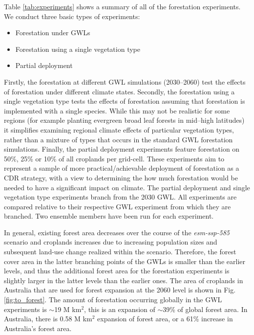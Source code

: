 \documentclass[]{article}
\begin{document}
Table \ref{tab:experiments} shows a summary of all of the forestation experiments. We conduct three basic types of experiments:

\begin{itemize}
    \item Forestation under GWLs
    \item Forestation using a single vegetation type
    \item Partial deployment
\end{itemize}

Firstly, the forestation at different GWL simulations (2030--2060) test the effects of forestation under different climate states.
Secondly, the forestation using a single vegetation type tests the effects of forestation assuming that forestation is implemented with a single species.
While this may not be realistic for some regions (for example planting evergreen broad leaf forests in mid--high latitudes) it simplifies examining regional climate effects of particular vegetation types, rather than a mixture of types that occurs in the standard GWL forestation simulations.
Finally, the partial deployment experiments feature forestation on 50\%, 25\% or 10\% of all croplands per grid-cell.
These experiments aim to represent a sample of more practical/achievable deployment of forestation as a CDR strategy, with a view to determining the how much forestation would be needed to have a significant impact on climate.
The partial deployment and single vegetation type experiments branch from the 2030 GWL.
All experiments are compared relative to their respective GWL experiment from which they are branched.
Two ensemble members have been run for each experiment.


In general, existing forest area decreases over the course of the \textit{esm-ssp-585} scenario and croplands increases due to increasing population sizes and subsequent land-use change realized within the scenario.
Therefore, the forest cover area in the latter branching points of the GWLs is smaller than the earlier levels, and thus the additional forest area for the forestation experiments is slightly larger in the latter levels than the earlier ones.
The area of croplands in Australia that are used for forest expansion at the 2060 level is shown in Fig. \ref{fig:to_forest}.
The amount of forestation occurring globally in the GWL experiments is $\sim$19 M km$^2$, this is an expansion of $\sim$39\% of global forest area.
In Australia, there is 0.58 M km$^2$ expansion of forest area, or a 61\% increase in Australia's forest area.
\end{document}
